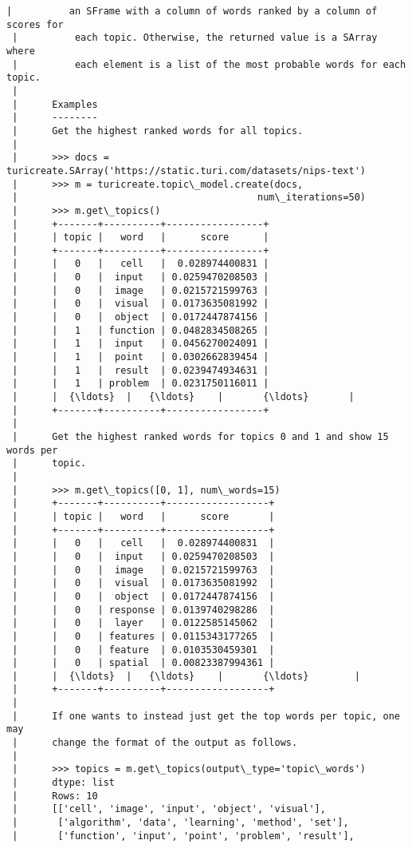 \documentclass[11pt]{ctexart}
\begin{document}
\begin{Verbatim}[commandchars=\\\{\}]
 |          an SFrame with a column of words ranked by a column of scores for
 |          each topic. Otherwise, the returned value is a SArray where
 |          each element is a list of the most probable words for each topic.
 |      
 |      Examples
 |      --------
 |      Get the highest ranked words for all topics.
 |      
 |      >>> docs = turicreate.SArray('https://static.turi.com/datasets/nips-text')
 |      >>> m = turicreate.topic\_model.create(docs,
 |                                          num\_iterations=50)
 |      >>> m.get\_topics()
 |      +-------+----------+-----------------+
 |      | topic |   word   |      score      |
 |      +-------+----------+-----------------+
 |      |   0   |   cell   |  0.028974400831 |
 |      |   0   |  input   | 0.0259470208503 |
 |      |   0   |  image   | 0.0215721599763 |
 |      |   0   |  visual  | 0.0173635081992 |
 |      |   0   |  object  | 0.0172447874156 |
 |      |   1   | function | 0.0482834508265 |
 |      |   1   |  input   | 0.0456270024091 |
 |      |   1   |  point   | 0.0302662839454 |
 |      |   1   |  result  | 0.0239474934631 |
 |      |   1   | problem  | 0.0231750116011 |
 |      |  {\ldots}  |   {\ldots}    |       {\ldots}       |
 |      +-------+----------+-----------------+
 |      
 |      Get the highest ranked words for topics 0 and 1 and show 15 words per
 |      topic.
 |      
 |      >>> m.get\_topics([0, 1], num\_words=15)
 |      +-------+----------+------------------+
 |      | topic |   word   |      score       |
 |      +-------+----------+------------------+
 |      |   0   |   cell   |  0.028974400831  |
 |      |   0   |  input   | 0.0259470208503  |
 |      |   0   |  image   | 0.0215721599763  |
 |      |   0   |  visual  | 0.0173635081992  |
 |      |   0   |  object  | 0.0172447874156  |
 |      |   0   | response | 0.0139740298286  |
 |      |   0   |  layer   | 0.0122585145062  |
 |      |   0   | features | 0.0115343177265  |
 |      |   0   | feature  | 0.0103530459301  |
 |      |   0   | spatial  | 0.00823387994361 |
 |      |  {\ldots}  |   {\ldots}    |       {\ldots}        |
 |      +-------+----------+------------------+
 |      
 |      If one wants to instead just get the top words per topic, one may
 |      change the format of the output as follows.
 |      
 |      >>> topics = m.get\_topics(output\_type='topic\_words')
 |      dtype: list
 |      Rows: 10
 |      [['cell', 'image', 'input', 'object', 'visual'],
 |       ['algorithm', 'data', 'learning', 'method', 'set'],
 |       ['function', 'input', 'point', 'problem', 'result'],

\end{Verbatim}
\end{document}
